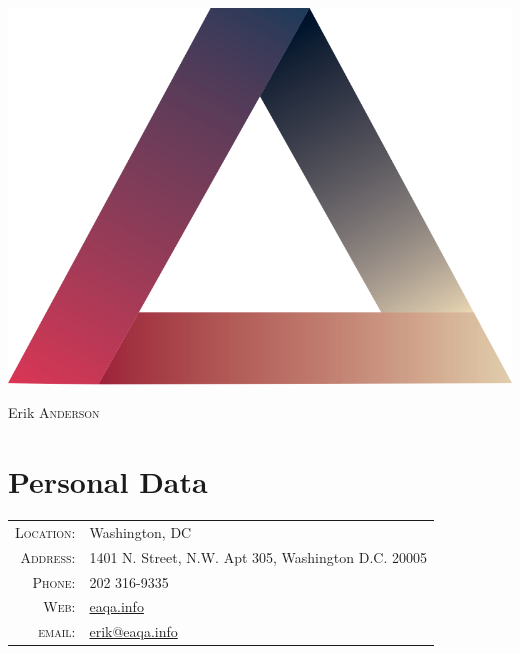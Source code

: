 \documentclass[a4paper,10pt]{article}
\begin{document}
    

\begin{flushright}
\includegraphics[width=.5 in]{Logo2.png}
\end{flushright}

\lhead{}
\chead{\leftmark}
\rhead{}
\cfoot{}
\chead{}
\renewcommand\headrule{}

\par{\centering
		{\Huge Erik \textsc{Anderson}
	}\bigskip\par}

\section{Personal Data}

\begin{tabular}{rl}
    \textsc{Location:} & Washington, DC   \\
    \textsc{Address:}   & 1401 N. Street, N.W. Apt 305, Washington D.C. 20005 \\
    \textsc{Phone:}     & 202 316-9335\\
    \textsc{Web:}     & \href{http://EAQA.info/}{eaqa.info}\\
    \textsc{email:}     & \href{mailto:erik@eaqa.info}{erik@eaqa.info}
\end{tabular}

\end{document}
